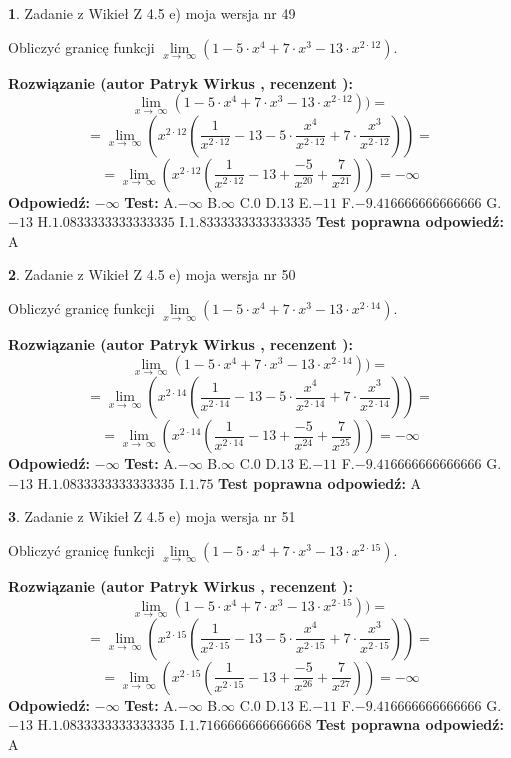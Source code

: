 \documentclass[12pt, a4paper]{article}
\theoremstyle{definition} %
\newtheorem{zad}{}
\newcommand{\zadStart}[1]{\begin{zad}#1\newline}
\newcommand{\zadStop}{\end{zad}}
\newcommand{\rozwStart}[2]{\noindent \textbf{Rozwiązanie (autor #1 , recenzent #2): }\newline}
\newcommand{\rozwStop}{\newline}
\newcommand{\odpStart}{\noindent \textbf{Odpowiedź:}\newline}
\newcommand{\odpStop}{\newline}
\newcommand{\testStart}{\noindent \textbf{Test:}\newline}
\newcommand{\testStop}{\newline}
\newcommand{\kluczStart}{\noindent \textbf{Test poprawna odpowiedź:}\newline}
\newcommand{\kluczStop}{\newline}
\begin{document}
\zadStart{Zadanie z Wikieł Z 4.5 e) moja wersja nr 49}


Obliczyć granicę funkcji  $\lim\limits_{x\to\ \infty}(1 - 5 \cdot x^{4}+7 \cdot x^{3}- 13 \cdot x^{2\cdot12})$.
\zadStop
\rozwStart{Patryk Wirkus}{}
$$\lim\limits_{x\to\ \infty}(1 - 5 \cdot x^{4}+7 \cdot x^{3}- 13 \cdot x^{2\cdot12}))=$$
$$=\lim\limits_{x\to\ \infty}(x^{2\cdot12}(\frac{1}{x^{2\cdot12}}-13 -5 \cdot \frac{x^{4}}{x^{2\cdot12}}+7 \cdot \frac{x^{3}}{x^{2\cdot12}}))=$$
$$=\lim\limits_{x\to\ \infty}(x^{2\cdot12}(\frac{1}{x^{2\cdot12}}-13 + \frac{-5}{x^{20}}+ \frac{7}{x^{21}}))=-\infty$$
\rozwStop
\odpStart
$-\infty$
\odpStop
\testStart
A.$-\infty$ B.$\infty$ C.$0$ D.$13$ E.$-11$
F.$-9.416666666666666$ G.$-13$
H.$1.0833333333333335$
I.$1.8333333333333335$
\testStop
\kluczStart
A
\kluczStop



\zadStart{Zadanie z Wikieł Z 4.5 e) moja wersja nr 50}


Obliczyć granicę funkcji  $\lim\limits_{x\to\ \infty}(1 - 5 \cdot x^{4}+7 \cdot x^{3}- 13 \cdot x^{2\cdot14})$.
\zadStop
\rozwStart{Patryk Wirkus}{}
$$\lim\limits_{x\to\ \infty}(1 - 5 \cdot x^{4}+7 \cdot x^{3}- 13 \cdot x^{2\cdot14}))=$$
$$=\lim\limits_{x\to\ \infty}(x^{2\cdot14}(\frac{1}{x^{2\cdot14}}-13 -5 \cdot \frac{x^{4}}{x^{2\cdot14}}+7 \cdot \frac{x^{3}}{x^{2\cdot14}}))=$$
$$=\lim\limits_{x\to\ \infty}(x^{2\cdot14}(\frac{1}{x^{2\cdot14}}-13 + \frac{-5}{x^{24}}+ \frac{7}{x^{25}}))=-\infty$$
\rozwStop
\odpStart
$-\infty$
\odpStop
\testStart
A.$-\infty$ B.$\infty$ C.$0$ D.$13$ E.$-11$
F.$-9.416666666666666$ G.$-13$
H.$1.0833333333333335$
I.$1.75$
\testStop
\kluczStart
A
\kluczStop



\zadStart{Zadanie z Wikieł Z 4.5 e) moja wersja nr 51}


Obliczyć granicę funkcji  $\lim\limits_{x\to\ \infty}(1 - 5 \cdot x^{4}+7 \cdot x^{3}- 13 \cdot x^{2\cdot15})$.
\zadStop
\rozwStart{Patryk Wirkus}{}
$$\lim\limits_{x\to\ \infty}(1 - 5 \cdot x^{4}+7 \cdot x^{3}- 13 \cdot x^{2\cdot15}))=$$
$$=\lim\limits_{x\to\ \infty}(x^{2\cdot15}(\frac{1}{x^{2\cdot15}}-13 -5 \cdot \frac{x^{4}}{x^{2\cdot15}}+7 \cdot \frac{x^{3}}{x^{2\cdot15}}))=$$
$$=\lim\limits_{x\to\ \infty}(x^{2\cdot15}(\frac{1}{x^{2\cdot15}}-13 + \frac{-5}{x^{26}}+ \frac{7}{x^{27}}))=-\infty$$
\rozwStop
\odpStart
$-\infty$
\odpStop
\testStart
A.$-\infty$ B.$\infty$ C.$0$ D.$13$ E.$-11$
F.$-9.416666666666666$ G.$-13$
H.$1.0833333333333335$
I.$1.7166666666666668$
\testStop
\kluczStart
A
\kluczStop
\end{document}
